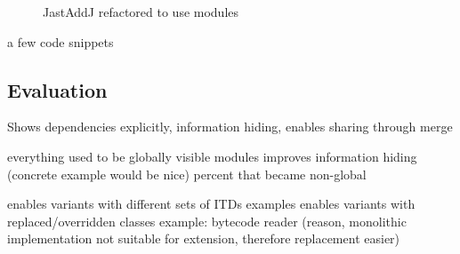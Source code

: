 \begin{figure}[htb!]
  \begin{center}
    \caption{JastAddJ refactored to use modules}
    \label{ModuleMainComponents}
  \end{center}
\end{figure}

a few code snippets

\subsection{Evaluation}

Shows dependencies explicitly, information hiding, enables sharing through merge

everything used to be globally visible
  modules improves information hiding 
    (concrete example would be nice)
    percent that became non-global

enables variants with different sets of ITDs
  examples
enables variants with replaced/overridden classes
  example: bytecode reader
  (reason, monolithic implementation not suitable for extension, therefore
  replacement easier)

